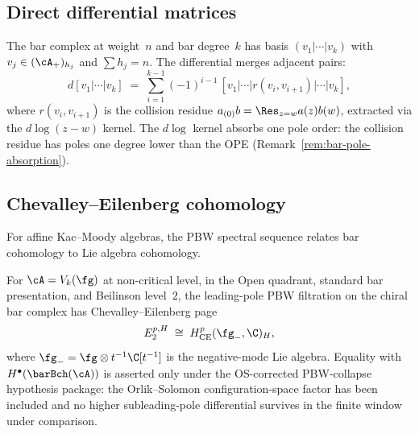 \subsection{Direct differential matrices}
\label{subsec:comp-direct-bar}

The bar complex at weight~$n$ and bar degree~$k$ has basis
$(v_1 | \cdots | v_k)$ with
$v_j \in (\cA_+)_{h_j}$ and $\sum h_j = n$. The differential
merges adjacent pairs:
\begin{equation}\label{eq:comp-bar-differential}
 d[v_1 | \cdots | v_k]
 \;=\; \sum_{i=1}^{k-1} (-1)^{i-1}\,
 [v_1 | \cdots | r(v_i, v_{i+1}) | \cdots | v_k],
\end{equation}
where $r(v_i, v_{i+1})$ is the collision residue
$a_{(0)} b = \Res_{z = w} a(z) b(w)$, extracted via the
$d\log(z{-}w)$ kernel. The $d\log$ kernel absorbs one pole
order: the collision residue has poles one degree lower than
the OPE
(Remark~\ref{rem:bar-pole-absorption}).


\subsection{Chevalley--Eilenberg cohomology}
\label{subsec:comp-ce-bar}

For affine Kac--Moody algebras, the PBW spectral sequence
relates bar cohomology to Lie algebra cohomology.

\begin{proposition}
\label{prop:comp-ce-bar}
\ClaimStatusConditional
For $\cA = V_k(\fg)$ at non-critical level, in the Open quadrant,
standard bar presentation, and Beilinson level~$2$, the leading-pole
PBW filtration on the chiral bar complex has Chevalley--Eilenberg page
\begin{equation}\label{eq:comp-ce-bar}
 E_2^{p,H}
 \;\cong\; H^p_{\CE}(\fg_-, \C)_H,
\end{equation}
where $\fg_- = \fg \otimes t^{-1}\C[t^{-1}]$ is the
negative-mode Lie algebra.  Equality with
$H^\bullet(\barBch(\cA))$ is asserted only under the
OS-corrected PBW-collapse hypothesis package: the Orlik--Solomon
configuration-space factor has been included and no higher
subleading-pole differential survives in the finite window under
comparison.
\end{proposition}

